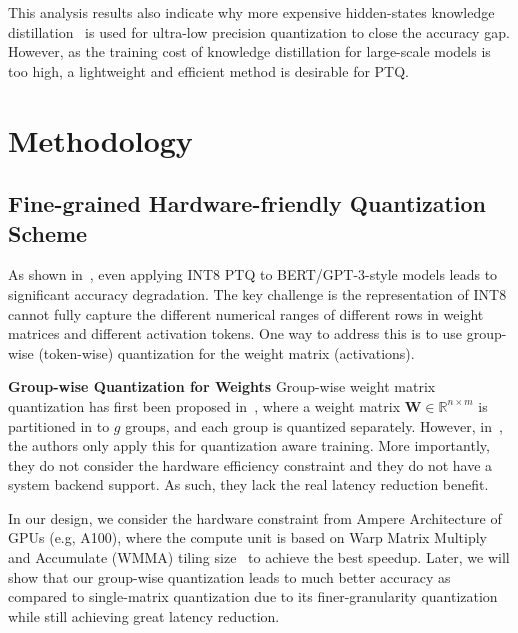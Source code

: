 This analysis results also indicate why more expensive hidden-states knowledge distillation~\cite{bai2020binarybert,li2016ternary} is used for ultra-low precision quantization to close the accuracy gap. However, as the training cost of knowledge distillation for large-scale models is too high, a lightweight and efficient method is desirable for PTQ. 

\section{Methodology}
\label{sec:methodology}
\subsection{Fine-grained Hardware-friendly Quantization Scheme}

As shown in~, even applying INT8 PTQ to BERT/GPT-3-style models leads to significant accuracy degradation. The key challenge is the representation of INT8 cannot fully capture the different numerical ranges of different rows in weight matrices and different activation tokens. One way to address this is to use group-wise (token-wise) quantization for the weight matrix (activations).

\textbf{Group-wise Quantization for Weights} Group-wise weight matrix quantization has first been proposed in~\cite{shen2020q}, where a weight matrix ${\mathbf{W}} \in {\mathbb{R}}^{n\times m}$ is partitioned in to $g$ groups, and each group is quantized separately. However, in~\cite{shen2020q}, the authors only apply this for quantization aware training. More importantly, they do not consider the hardware efficiency constraint and they do not have a system backend support. As such, they lack the real latency reduction benefit.

In our design, we consider the hardware constraint from Ampere Architecture of GPUs (e.g, A100), where the compute unit is based on Warp Matrix Multiply and Accumulate (WMMA) tiling size~\cite{nvidia_wmma} to achieve the best speedup. Later, we will show that our group-wise quantization leads to much better accuracy as compared to single-matrix quantization due to its finer-granularity quantization while still achieving great latency reduction.

